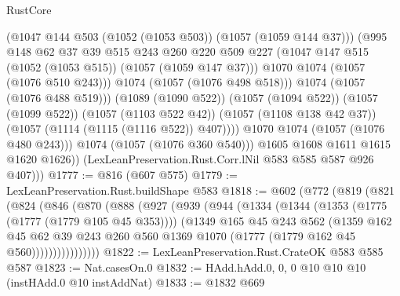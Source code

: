 \begin{lexlean}{RustCore}
\begin{coremodule}
                        (@1047 @144 @503 (@1052 (@1053 @503)) (@1057 (@1059 @144 @37)))
                        (@995
                          @148
                          @62
                          @37
                          @39
                          @515
                          @243
                          @260
                          @220
                          @509
                          @227
                          (@1047 @147 @515 (@1052 (@1053 @515)) (@1057 (@1059 @147 @37)))
                          @1070
                          @1074
                          (@1057 (@1076 @510 @243)))
                        @1074
                        (@1057 (@1076 @498 @518)))
                      @1074
                      (@1057 (@1076 @488 @519)))
                    (@1089 (@1090 @522))
                    (@1057 (@1094 @522))
                    (@1057 (@1099 @522))
                    (@1057 (@1103 @522 @42))
                    (@1057 (@1108 @138 @42 @37))
                    (@1057 (@1114 (@1115 (@1116 @522)) @407))))
                @1070
                @1074
                (@1057 (@1076 @480 @243)))
              @1074
              (@1057 (@1076 @360 @540)))
            @1605
            @1608
            @1611
            @1615
            @1620
            @1626))
        (LexLeanPreservation.Rust.Corr.lNil @583 @585 @587 @926 @407)))
@1777 := @816 (@607 @575)
@1779 := LexLeanPreservation.Rust.buildShape @583
@1818 := @602
    (@772
      (@819
        (@821
          (@824
            (@846
              (@870
                (@888
                  (@927
                    (@939
                      (@944
                        (@1334
                          (@1344
                            (@1353 (@1775 (@1777 (@1779 @105 @45 @353))))
                            (@1349
                              @165
                              @45
                              @243
                              @562
                              (@1359
                                @162
                                @45
                                @62
                                @39
                                @243
                                @260
                                @560
                                @1369
                                @1070
                                (@1777 (@1779 @162 @45 @560))))))))))))))))
@1822 := LexLeanPreservation.Rust.CrateOK @583 @585 @587
@1823 := Nat.casesOn.{0}
@1832 := HAdd.hAdd.{0, 0, 0} @10 @10 @10 (instHAdd.{0} @10 instAddNat)
@1833 := @1832 @669

\end{coremodule}
\end{lexlean}
